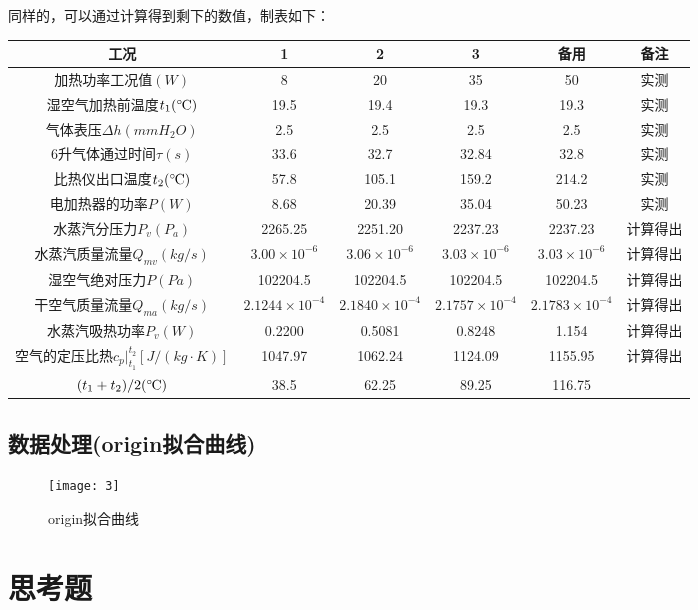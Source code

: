 \documentclass[UTF8,a4paper,10pt]{ctexart}
\def \celsius{\ensuremath{^\circ\hspace{-0.09em}\mathrm{C}}}
\begin{document}
		
	同样的，可以通过计算得到剩下的数值，制表如下：\\
	\begin{tabular}{|c|c|c|c|c|c|}
		\hline 
		工况 & 1 & 2 & 3 & 备用 & 备注 \\ 
		\hline 
		加热功率工况值$(W)$ & 8 & 20 & 35 & 50 & 实测 \\ 
		\hline 
		湿空气加热前温度$t_{1}(\celsius )$& 19.5 & 19.4 & 19.3 & 19.3 & 实测 \\ 
		\hline 
		气体表压$\Delta h(mmH_{2}O)$& 2.5 & 2.5 & 2.5 & 2.5 & 实测 \\ 
		\hline 
		6升气体通过时间$\tau (s)$& 33.6 & 32.7 & 32.84 & 32.8 & 实测 \\
		\hline 
		比热仪出口温度$t_{2}(\celsius)$& 57.8 & 105.1 & 159.2 & 214.2 & 实测 \\ 
		\hline 
		电加热器的功率$P(W)$& 8.68 & 20.39 & 35.04 & 50.23 & 实测 \\ 
		\hline 
		水蒸汽分压力$P_{v}(P_{a})$& 2265.25 & 2251.20 & 2237.23 & 2237.23 & 计算得出\\ 
		\hline 
		水蒸汽质量流量$Q_{mv}(kg/s)$& $3.00\times10^{-6}$ & $3.06\times10^{-6}$ & $3.03\times10^{-6}$ & $3.03\times10^{-6}$ & 计算得出 \\ 
		\hline 
		湿空气绝对压力$P(Pa)$& 102204.5 & 102204.5 & 102204.5 & 102204.5 & 计算得出\\ 
		\hline 
		干空气质量流量$Q_{ma}(kg/s)$& $2.1244\times10^{-4}$ & $2.1840\times10^{-4}$ & $2.1757\times10^{-4}$ & $2.1783\times10^{-4}$ & 计算得出\\ 
		\hline 
		水蒸汽吸热功率$P_{v}(W)$& 0.2200 & 0.5081 & 0.8248 & 1.154 & 计算得出\\ 
		\hline 
		空气的定压比热$c_{p}\big |^{t_{2}}_{t_{1}} [J/(kg\cdot K)]$& 1047.97 & 1062.24 & 1124.09 & 1155.95 & 计算得出\\ 
		\hline 
		$(t_{1}+t_{2})/2(\celsius )$& 38.5 & 62.25 & 89.25 & 116.75 & \\ 
		\hline 
	\end{tabular} 
\subsection{数据处理(origin拟合曲线)}
\begin{figure}[h]
	\centering
	\texttt{[image: 3]}
	\caption{origin拟合曲线}
\end{figure}
\section{思考题}
\end{document}
